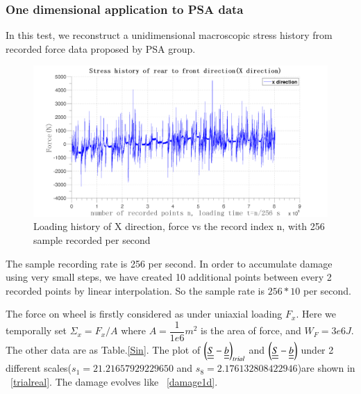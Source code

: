 \documentclass[3p,times,procedia,number]{elsarticle}
\newcommand{\figref}[1]{\figurename~\ref{#1}}
\begin{document}
\subsubsection{One dimensional application to PSA data}
In this test, we reconstruct a unidimensional macroscopic stress history from recorded force data proposed by PSA group. 
\begin{figure}[!h]
	\centering
	\includegraphics[width=\textwidth]{figures//x.png} 
	\caption{Loading history of X direction, force vs the record index n, with 256 sample recorded per second}
	\label{x}
\end{figure}

The sample recording rate is 256 per second. In order to accumulate damage using very small steps, we have created 10 additional points between every 2 recorded points by linear interpolation. So the sample rate is $256*10$ per second. 

The force on wheel is firstly considered as under uniaxial loading $F_x$. Here we temporally set $\Sigma_x=F_x/A$ where $A=\dfrac{1}{1e6} m^2$ is the area of force, and $W_F=3e6 J$. The other data are as Table.\ref{Sin}. The plot of $\left( \uline{\uline{S}}-\uline{\uline{b}}\right)_{trial}$ and $\left( \uline{\uline{S}}-\uline{\uline{b}}\right)$ under 2 different scales($s_1=21.21657929229650$ and $s_8=2.176132808422946$)are shown in \figref{trialreal}. The damage evolves like \figref{damage1d}.
\end{document}

